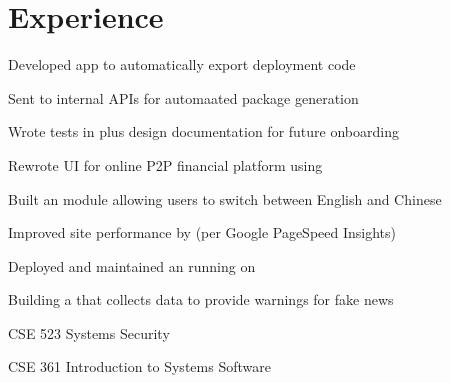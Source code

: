 \documentclass[]{deedy-resume-openfont}
\begin{document}
\hfill
\begin{minipage}[t]{0.66\textwidth}


\section{Experience}

\vspace{\topsep} %
\begin{tightemize}
\item Developed  app to automatically export deployment code
\item Sent  to internal APIs for automaated package generation
\item Wrote tests in  plus design documentation for future onboarding
\end{tightemize}
\sectionsep

\begin{tightemize}
\item Rewrote UI for online P2P financial platform using 
\item Built an  module allowing users to switch between English and Chinese
\item Improved site performance by  (per Google PageSpeed Insights)
\end{tightemize}
\sectionsep

\begin{tightemize}
\item Deployed and maintained an  running  on  
\item Building a  that collects data to provide warnings for fake news
\end{tightemize}
\sectionsep

\begin{tightemize}
\item CSE 523 Systems Security
\item CSE 361 Introduction to Systems Software
\end{tightemize}
\sectionsep


\end{minipage}
\end{document}

